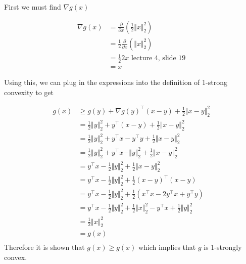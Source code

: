 \documentclass{exam}
\begin{document}
\begin{questions}
\begin{parts}
{            First we must find $\nabla g(x)$

            \begin{align}
                \nabla g(x) & = \frac{\partial}{\partial x} (\frac{1}{2} \Vert x \Vert_2^2) \\
                            & = \frac{1}{2} \frac{\partial}{\partial x} (\Vert x \Vert_2^2) \\
                            & = \frac{1}{2} 2 x \text{ lecture 4, slide 19}                                             \\
                            & = x
            \end{align}

            Using this, we can plug in the expressions into the definition of 1-strong convexity to get

            \begin{align*}
                g(x) & \geq g(y) + \nabla g(y)^\top (x - y) + \frac{1}{2} \Vert x - y \Vert_2^2                                             \\
                     & = \frac{1}{2}\Vert y \Vert_2^2 + y^\top (x - y) + \frac{1}{2} \Vert x - y \Vert_2^2                                  \\
                     & = \frac{1}{2}\Vert y \Vert_2^2 + y^\top x - y^\top y + \frac{1}{2} \Vert x - y \Vert_2^2                             \\
                     & = \frac{1}{2}\Vert y \Vert_2^2 + y^\top x - \Vert y \Vert_2^2 + \frac{1}{2} \Vert x - y \Vert_2^2                    \\
                     & = y^\top x - \frac{1}{2}\Vert y \Vert_2^2 + \frac{1}{2} \Vert x - y \Vert_2^2                                        \\
                     & = y^\top x - \frac{1}{2}\Vert y \Vert_2^2 + \frac{1}{2} (x - y)^\top(x - y)                                          \\
                     & = y^\top x - \frac{1}{2}\Vert y \Vert_2^2 + \frac{1}{2} (x^\top x - 2 y^\top x + y^\top y)                           \\
                     & = y^\top x - \frac{1}{2}\Vert y \Vert_2^2 + \frac{1}{2} \Vert x \Vert_2^2 - y^\top x + \frac{1}{2} \Vert y \Vert_2^2 \\
                     & = \frac{1}{2} \Vert x \Vert_2^2                                                                                      \\
                     & = g(x)                                                                                                               \\
            \end{align*}
            Therefore it is shown that $g(x) \geq g(x)$ which implies that $g$ is $1$-strongly convex.
        }


\end{parts}
\end{questions}
\end{document}
